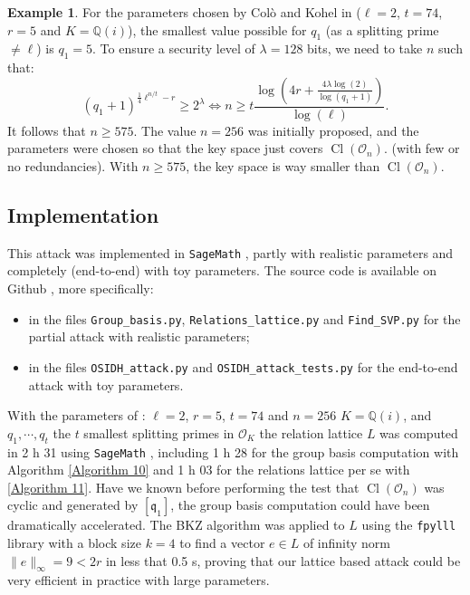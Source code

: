 \documentclass[a4paper,10pt,notitlepage]{report}
\theoremstyle{definition}
\theoremstyle{plain}
\theoremstyle{definition}
\newtheorem{Example}[Definition]{Example}
\newcommand{\Q}{\mathbb{Q}}
\newcommand{\mO}{\mathcal{O}}
\renewcommand{\(}{\left(}
\renewcommand{\)}{\right)}
\newcommand{\mf}[1]{\mathfrak{#1}}
\DeclareMathOperator{\Cl}{Cl}
\begin{document}
\begin{Example}
For the parameters chosen by Col\`{o} and Kohel in \cite[Section 6]{OSIDH} ($\ell=2$, $t=74$, $r=5$ and $K=\Q(i)$), the smallest value possible for $q_1$ (as a splitting prime $\neq \ell$) is $q_1=5$. To ensure a security level of $\lambda=128$ bits,  we need to take $n$ such that:
\[(q_1+1)^{\frac{1}{4}\ell^{n/t}-r}\geq 2^\lambda \Longleftrightarrow n\geq t\frac{\log\(4r+\frac{4\lambda\log(2)}{\log(q_1+1)}\)}{\log(\ell)}.\]
It follows that $n\geq 575$. The value $n=256$ was initially proposed, and the parameters were chosen so that the key space just covers $\Cl(\mO_n)$. (with few or no redundancies). With $n\geq 575$, the key space is way smaller than $\Cl(\mO_n)$.
\end{Example}

\subsection{Implementation}\label{Paragraph 17}

This attack was implemented in \verb?SageMath? \cite{sagemath}, partly with realistic parameters and completely (end-to-end) with toy parameters. The source code is available on Github \cite{MyGithub}, more specifically:
\begin{itemize}
\item  in the files \verb?Group_basis.py?, \verb?Relations_lattice.py? and \verb?Find_SVP.py? for the partial attack with realistic parameters;
\item in the files \verb?OSIDH_attack.py? and \verb?OSIDH_attack_tests.py? for the end-to-end attack with toy parameters.
\end{itemize}

With the parameters of \cite[p. 28]{OSIDH}: $\ell=2$, $r=5$, $t=74$ and $n=256$ $K=\Q(i)$,  and $q_1,\cdots, q_t$ the $t$ smallest splitting primes in $\mO_K$ the relation lattice $L$ was computed in 2 h 31 using \verb?SageMath? \cite{sagemath}, including 1 h 28 for the group basis computation with Algorithm \ref{Algorithm 10} and 1 h 03 for the relations lattice per se with \ref{Algorithm 11}. Have we known before performing the test that $\Cl(\mO_n)$ was cyclic and generated by $[\mf{q}_1]$, the group basis computation could have been dramatically accelerated. The BKZ algorithm \cite{BKZ} was applied to $L$ using the \verb?fpylll? library \cite{fpylll} with a block size $k=4$ to find a vector $e\in L$ of infinity norm $\|e\|_\infty=9<2r$ in less that 0.5 s, proving that our lattice based attack could be very efficient in practice with large parameters.
\end{document}

